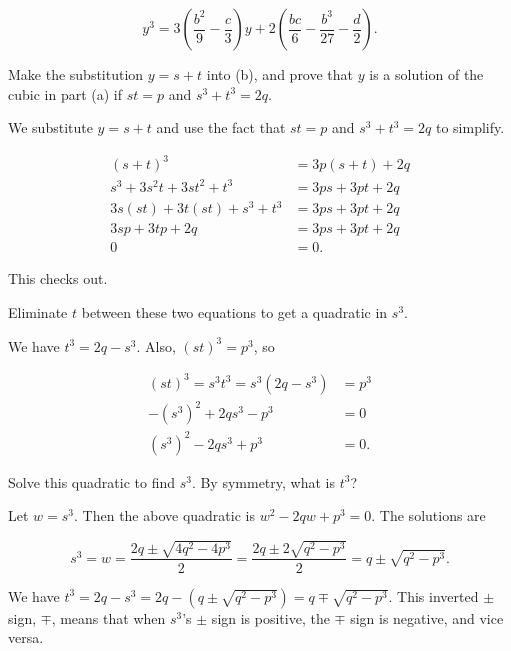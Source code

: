 \documentclass[../key.tex]{subfiles}
\begin{document}
$$y^3 = 3\left(\frac{b^2}{9} - \frac{c}{3}\right)y + 2 \left(\frac{bc}{6} - \frac{b^3}{27} - \frac{d}{2}\right).$$

\begin{inner_problem}
\item Make the substitution $y=s+t$ into (b), and prove that $y$ is a solution of the cubic in part (a) if $st=p$ and $s^3+t^3=2q$.
\end{inner_problem}

We substitute $y=s+t$ and use the fact that $st=p$ and $s^3+t^3=2q$ to simplify.

\begin{align*}
(s+t)^3 &= 3p(s+t) + 2q \\
s^3 + 3s^2t + 3st^2 + t^3 &= 3ps + 3pt + 2q \\
3s(st) + 3t(st) + s^3 + t^3 &= 3ps + 3pt + 2q \\
3sp + 3tp + 2q &= 3ps + 3pt + 2q \\
0 &= 0.
\end{align*}

This checks out.

\begin{inner_problem}
\item Eliminate $t$ between these two equations to get a quadratic in $s^3$.
\end{inner_problem}

We have $t^3=2q-s^3$. Also, $(st)^3=p^3$, so

\begin{align*}
(st)^3=s^3t^3=s^3(2q-s^3) &= p^3 \\
-(s^3)^2 + 2qs^3 - p^3 &= 0 \\
(s^3)^2 - 2qs^3 + p^3 &= 0.
\end{align*}

\begin{inner_problem}
\item Solve this quadratic to find $s^3$. By symmetry, what is $t^3$?
\end{inner_problem}

Let $w=s^3$. Then the above quadratic is $w^2 - 2qw + p^3 = 0$. The solutions are

$$s^3 = w = \frac{2q \pm \sqrt{4q^2 - 4p^3}}{2}=\frac{2q\pm 2\sqrt{q^2 - p^3}}{2} = q\pm \sqrt{q^2 - p^3}.$$

We have $t^3 = 2q - s^3 = 2q - (q \pm \sqrt{q^2 - p^3}) = q \mp \sqrt{q^2-p^3}$. This inverted $\pm$ sign, $\mp$, means that when $s^3$'s $\pm$ sign is positive, the $\mp$ sign is negative, and vice versa.
\end{document}
